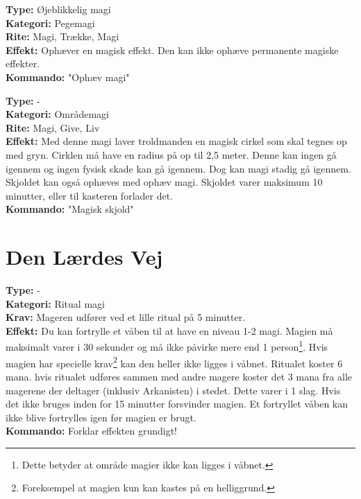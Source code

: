 \begin{primærMagi*}
\textbf{Type:} Øjeblikkelig magi\\
\textbf{Kategori:} Pegemagi\\
\textbf{Rite:} Magi, Trække, Magi\\
\textbf{Effekt:} Ophæver en magisk effekt. Den kan ikke ophæve permanente magiske effekter.\\ 
\textbf{Kommando:} "Ophæv magi"
\end{primærMagi*}

\begin{primærMagi*}
\textbf{Type:} -\\
\textbf{Kategori:} Områdemagi \\
\textbf{Rite:} Magi, Give, Liv \\
\textbf{Effekt:} Med denne magi laver troldmanden en magisk cirkel som skal tegnes op med gryn. Cirklen må have
en radius på op til 2,5 meter. Denne kan ingen gå igennem og ingen fysisk skade kan gå igennem. Dog kan magi stadig gå igennem. Skjoldet kan også ophæves med ophæv magi. Skjoldet varer maksimum 10 minutter, eller til kasteren forlader det. \\
\textbf{Kommando:} "Magisk skjold"
\end{primærMagi*}

\section{Den Lærdes Vej}
\begin{lærdMagi*}
\textbf{Type:} - \\
\textbf{Kategori:} Ritual magi\\
\textbf{Krav:} Mageren udfører ved et lille ritual på 5 minutter.\\
\textbf{Effekt:} Du kan fortrylle et våben til at have en niveau 1-2 magi. Magien må maksimalt varer i 30 sekunder og må ikke påvirke mere end 1 person\footnote{Dette betyder at område magier ikke kan ligges i våbnet.}. Hvis magien har specielle krav\footnote{Foreksempel at magien kun kan kastes på en helliggrund.} kan den heller ikke ligges i våbnet. Ritualet koster 6 mana. hvis ritualet udføres sammen med andre magere koster det 3 mana fra alle magerene der deltager (inklusiv Arkanisten) i stedet. Dette varer i 1 slag. Hvis det ikke bruges inden for 15 minutter forsvinder magien. Et fortryllet våben kan ikke blive fortrylles igen før magien er brugt.\\
\textbf{Kommando:} Forklar effekten grundigt!\\
\end{lærdMagi*}

